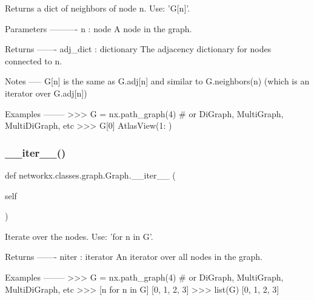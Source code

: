 \begin{DoxyVerb}Returns a dict of neighbors of node n.  Use: 'G[n]'.

Parameters
----------
n : node
   A node in the graph.

Returns
-------
adj_dict : dictionary
   The adjacency dictionary for nodes connected to n.

Notes
-----
G[n] is the same as G.adj[n] and similar to G.neighbors(n)
(which is an iterator over G.adj[n])

Examples
--------
>>> G = nx.path_graph(4)  # or DiGraph, MultiGraph, MultiDiGraph, etc
>>> G[0]
AtlasView({1: {}})
\end{DoxyVerb}
 \mbox{\label{classnetworkx_1_1classes_1_1graph_1_1Graph_a111aa635ef36c13b4cb26320fb58435b}} 
\subsubsection{\texorpdfstring{\+\_\+\+\_\+iter\+\_\+\+\_\+()}{\_\_iter\_\_()}}
{\footnotesize\ttfamily def networkx.\+classes.\+graph.\+Graph.\+\_\+\+\_\+iter\+\_\+\+\_\+ (\begin{DoxyParamCaption}\item[{}]{self }\end{DoxyParamCaption})}

\begin{DoxyVerb}Iterate over the nodes. Use: 'for n in G'.

Returns
-------
niter : iterator
    An iterator over all nodes in the graph.

Examples
--------
>>> G = nx.path_graph(4)  # or DiGraph, MultiGraph, MultiDiGraph, etc
>>> [n for n in G]
[0, 1, 2, 3]
>>> list(G)
[0, 1, 2, 3]
\end{DoxyVerb}
 \mbox{\label{classnetworkx_1_1classes_1_1graph_1_1Graph_a78ea8d70a57f629e27064654718d8229}} 
